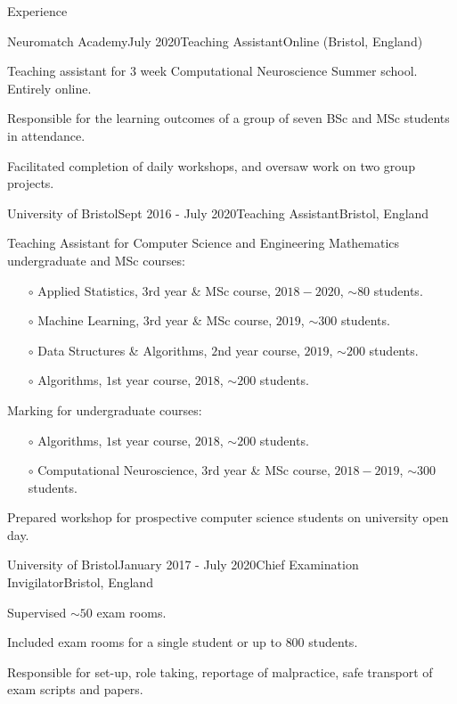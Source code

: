 \documentclass{resume} %
\begin{document}
\begin{rSection}{Experience}

  \begin{rSubsection}{Neuromatch Academy}{July 2020}{Teaching Assistant}{Online (Bristol, England)}
    \item Teaching assistant for 3 week Computational Neuroscience Summer school. Entirely online.
    \item Responsible for the learning outcomes of a group of seven BSc and MSc students in attendance.
    \item Facilitated completion of daily workshops, and oversaw work on two group projects.
  \end{rSubsection}

  \begin{rSubsection}{University of Bristol}{Sept 2016 - July 2020}{Teaching Assistant}{Bristol, England}
    \item Teaching Assistant for Computer Science and Engineering Mathematics undergraduate and MSc courses:
      \begin{itemize}
        \item[$\circ$] Applied Statistics, $3$rd year \&  MSc course, $2018 - 2020$, $\sim 80$ students.
        \item[$\circ$] Machine Learning, $3$rd year \& MSc course, $2019$, $\sim 300$ students.
        \item[$\circ$] Data Structures \& Algorithms, $2$nd year course, $2019$, $\sim 200$ students.
        \item[$\circ$] Algorithms, $1$st year course, $2018$, $\sim 200$ students.
      \end{itemize}\vspace{1.5mm}
    \item Marking for undergraduate courses:
      \begin{itemize}
        \item[$\circ$] Algorithms, $1$st year course, $2018$, $\sim 200$ students.
        \item[$\circ$] Computational Neuroscience, $3$rd year \& MSc course, $2018-2019$, $\sim 300$ students.
      \end{itemize}\vspace{1.5mm}
    \item Prepared workshop for prospective computer science students on university open day.
  \end{rSubsection}

  \begin{rSubsection}{University of Bristol}{January 2017 - July 2020}{Chief Examination Invigilator}{Bristol, England}
    \item Supervised $\sim 50$ exam rooms.
    \item Included exam rooms for a single student or up to $800$ students.
    \item Responsible for set-up, role taking, reportage of malpractice, safe transport of exam scripts and papers.
  \end{rSubsection}


\end{rSection}
\end{document}

